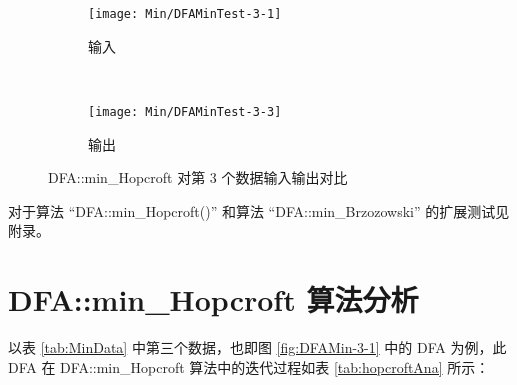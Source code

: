 \begin{figure}[!htbp]
    \centering
    \begin{subfigure}[b]{0.4\textwidth}
        \texttt{[image: Min/DFAMinTest-3-1]}
        \caption{输入}
        \label{fig:DFAMin-3-1-inside}
    \end{subfigure}
    ~
    \begin{subfigure}[b]{0.4\textwidth}
        \texttt{[image: Min/DFAMinTest-3-3]}
        \caption{输出}
        \label{fig:DFAMin-3-3-inside}
    \end{subfigure}
    \caption{DFA::min\_Hopcroft 对第 3 个数据输入输出对比}
    \label{fig:DFAMinHoop-3}
  \end{figure}

对于算法 “DFA::min\_Hopcroft()” 和算法 “DFA::min\_Brzozowski” 的扩展测试见附录。

\section{DFA::min\_Hopcroft 算法分析}

以表 \ref{tab:MinData} 中第三个数据，也即图 \ref{fig:DFAMin-3-1} 中的 DFA 为例，此 DFA 在 DFA::min\_Hopcroft 算法中的迭代过程如表 \ref{tab:hopcroftAna} 所示：

